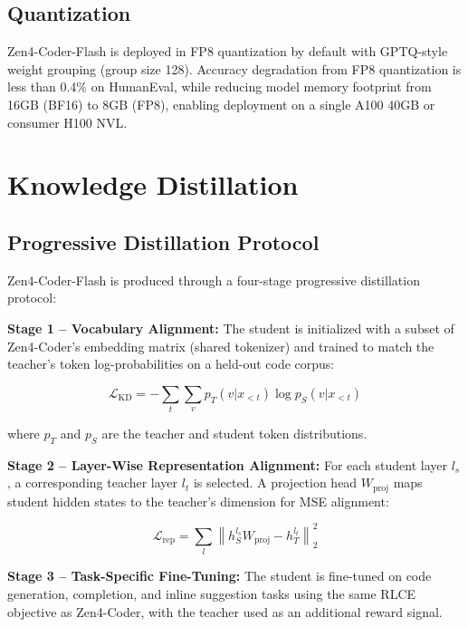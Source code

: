 \documentclass[11pt,a4paper]{article}
\begin{document}
\subsection{Quantization}

Zen4-Coder-Flash is deployed in FP8 quantization by default with GPTQ-style weight grouping (group size 128). Accuracy degradation from FP8 quantization is less than 0.4\% on HumanEval, while reducing model memory footprint from 16GB (BF16) to 8GB (FP8), enabling deployment on a single A100 40GB or consumer H100 NVL.

\section{Knowledge Distillation}

\subsection{Progressive Distillation Protocol}

Zen4-Coder-Flash is produced through a four-stage progressive distillation protocol:

\textbf{Stage 1 -- Vocabulary Alignment:} The student is initialized with a subset of Zen4-Coder's embedding matrix (shared tokenizer) and trained to match the teacher's token log-probabilities on a held-out code corpus:

\begin{equation}
  \mathcal{L}_{\text{KD}} = -\sum_t \sum_v p_T(v | x_{<t}) \log p_S(v | x_{<t})
\end{equation}

where $p_T$ and $p_S$ are the teacher and student token distributions.

\textbf{Stage 2 -- Layer-Wise Representation Alignment:} For each student layer $l_s$, a corresponding teacher layer $l_t$ is selected. A projection head $W_{\text{proj}}$ maps student hidden states to the teacher's dimension for MSE alignment:

\begin{equation}
  \mathcal{L}_{\text{rep}} = \sum_{l} \left\| h_S^{l_s} W_{\text{proj}} - h_T^{l_t} \right\|_2^2
\end{equation}

\textbf{Stage 3 -- Task-Specific Fine-Tuning:} The student is fine-tuned on code generation, completion, and inline suggestion tasks using the same RLCE objective as Zen4-Coder, with the teacher used as an additional reward signal.
\end{document}
